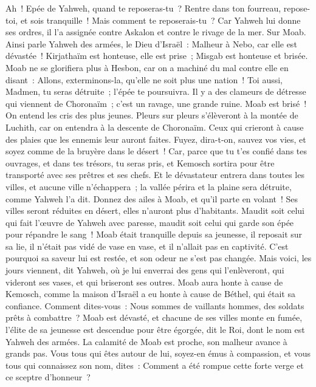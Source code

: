 \begin{multicols}{2}
Ah~! Epée de Yahweh, quand te reposeras-tu~? Rentre dans ton fourreau, repose-toi, et sois tranquille~!
Mais comment te reposerais-tu~? Car Yahweh lui donne ses ordres, il l'a assignée contre Askalon et contre le rivage de la mer.
\VerseOne{}Sur Moab. Ainsi parle Yahweh des armées, le Dieu d'Israël~: Malheur à Nebo, car elle est dévastée~! Kirjathaïm est honteuse, elle est prise~; Misgab est honteuse et brisée.
Moab ne se glorifiera plus à Hesbon, car on a machiné du mal contre elle en disant~: Allons, exterminons-la, qu'elle ne soit plus une nation~! Toi aussi, Madmen, tu seras détruite~; l'épée te poursuivra.
Il y a des clameurs de détresse qui viennent de Choronaïm~; c'est un ravage, une grande ruine.
Moab est brisé~! On entend les cris des plus jeunes.
Pleurs sur pleurs s'élèveront à la montée de Luchith, car on entendra à la descente de Choronaïm. Ceux qui crieront à cause des plaies que les ennemis leur auront faites.
Fuyez, dira-t-on, sauvez vos vies, et soyez comme de la bruyère dans le désert~!
Car, parce que tu t'es confié dans tes ouvrages, et dans tes trésors, tu seras pris, et Kemosch sortira pour être transporté avec ses prêtres et ses chefs.
Et le dévastateur entrera dans toutes les villes, et aucune ville n'échappera~; la vallée périra et la plaine sera détruite, comme Yahweh l'a dit.
Donnez des ailes à Moab, et qu'il parte en volant~! Ses villes seront réduites en désert, elles n'auront plus d'habitants.
Maudit soit celui qui fait l'œuvre de Yahweh avec paresse, maudit soit celui qui garde son épée pour répandre le sang~!
Moab était tranquille depuis sa jeunesse, il reposait sur sa lie, il n'était pas vidé de vase en vase, et il n'allait pas en captivité. C'est pourquoi sa saveur lui est restée, et son odeur ne s'est pas changée.
Mais voici, les jours viennent, dit Yahweh, où je lui enverrai des gens qui l'enlèveront, qui videront ses vases, et qui briseront ses outres.
Moab aura honte à cause de Kemosch, comme la maison d'Israël a eu honte à cause de Béthel, qui était sa confiance.
Comment dites-vous~: Nous sommes de vaillants hommes, des soldats prêts à combattre~?
Moab est dévasté, et chacune de ses villes monte en fumée, l'élite de sa jeunesse est descendue pour être égorgée, dit le Roi, dont le nom est Yahweh des armées.
La calamité de Moab est proche, son malheur avance à grands pas.
Vous tous qui êtes autour de lui, soyez-en émus à compassion, et vous tous qui connaissez son nom, dites~: Comment a été rompue cette forte verge et ce sceptre d'honneur~? 

\end{multicols}
